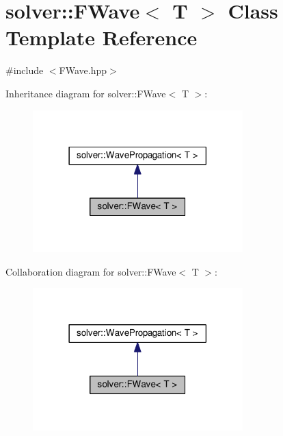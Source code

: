 \hypertarget{classsolver_1_1FWave}{}\section{solver\+:\+:F\+Wave$<$ T $>$ Class Template Reference}
\label{classsolver_1_1FWave}


{\ttfamily \#include $<$F\+Wave.\+hpp$>$}



Inheritance diagram for solver\+:\+:F\+Wave$<$ T $>$\+:\nopagebreak
\begin{figure}[H]
\begin{center}
\leavevmode
\includegraphics[width=230pt]{classsolver_1_1FWave__inherit__graph}
\end{center}
\end{figure}


Collaboration diagram for solver\+:\+:F\+Wave$<$ T $>$\+:\nopagebreak
\begin{figure}[H]
\begin{center}
\leavevmode
\includegraphics[width=230pt]{classsolver_1_1FWave__coll__graph}
\end{center}
\end{figure}

